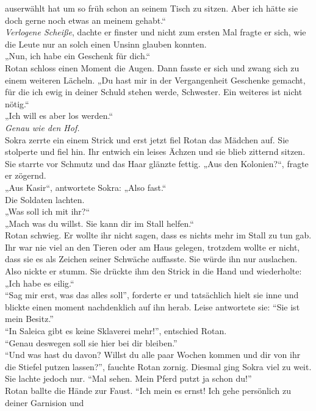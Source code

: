 auserwählt 
hat um so früh schon an seinem Tisch zu sitzen. Aber ich hätte sie doch gerne noch etwas an meinem 
gehabt.“\\
\textit{Verlogene Scheiße}, dachte er finster und nicht zum ersten Mal fragte er sich, wie die 
Leute nur an solch einen Unsinn glauben konnten.\\
„Nun, ich habe ein Geschenk für dich.“\\
Rotan schloss einen Moment die Augen. Dann fasste er sich und zwang sich zu einem weiteren Lächeln. 
„Du hast mir in der Vergangenheit Geschenke gemacht, für die ich ewig in deiner Schuld stehen 
werde, 
Schwester. Ein weiteres ist nicht nötig.“\\
„Ich will es aber los werden.“\\
\textit{Genau wie den Hof.}\\
Sokra zerrte ein einem Strick und erst jetzt fiel Rotan das Mädchen auf. Sie stolperte und fiel 
hin. 
Ihr entwich ein leises Ächzen und sie blieb zitternd sitzen. Sie starrte vor Schmutz und das Haar 
glänzte fettig. „Aus den Kolonien?“, fragte er zögernd.\\
„Aus Kasir“, antwortete Sokra: „Also fast.“\\
Die Soldaten lachten. \\
„Was soll ich mit ihr?“\\
„Mach was du willst. Sie kann dir im Stall helfen.“\\
Rotan schwieg. Er wollte ihr nicht sagen, dass es nichts mehr im Stall zu tun gab. Ihr war nie viel 
an den Tieren oder am Haus gelegen, trotzdem wollte er nicht, dass sie es als Zeichen seiner 
Schwäche auffasste. Sie würde ihn nur auslachen. Also nickte er stumm. Sie drückte ihm den Strick 
in 
die Hand und wiederholte: „Ich habe es eilig.“\\
``Sag mir erst, was das alles soll'', forderte er und tatsächlich hielt sie inne und blickte einen 
moment nachdenklich auf ihn herab. Leise antwortete sie: ``Sie ist mein Besitz.''\\
``In Saleica gibt es keine Sklaverei mehr!'', entschied Rotan.\\
``Genau deswegen soll sie hier bei dir bleiben.''\\
``Und was hast du davon? Willst du alle paar Wochen kommen und dir von ihr die Stiefel putzen 
lassen?'', fauchte Rotan zornig. Diesmal ging Sokra viel zu weit.\\
Sie lachte jedoch nur. ``Mal sehen. Mein Pferd putzt ja schon du!''\\
Rotan ballte die Hände zur Faust. ``Ich mein es ernst! Ich gehe persönlich zu deiner Garnision und 
